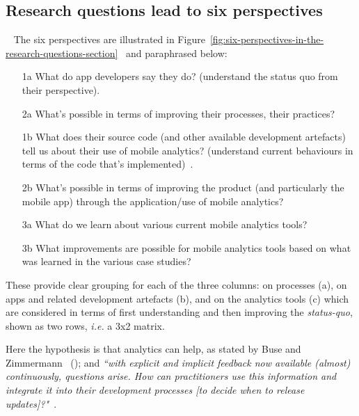 \subsection{Research questions lead to six perspectives}~\label{rq-leads-to-six-perspectives}
The six perspectives are illustrated in Figure~\ref{fig:six-perspectives-in-the-research-questions-section}~ and paraphrased below:
{\footnotesize
\begin{enumerate}
    \item [1a] What do app developers say they do? (understand the status quo from their perspective).
    \item [2a] What's possible in terms of improving their processes, their practices?
    \item [1b] What does their source code (and other available development artefacts) tell us about their use of mobile analytics? (understand current behaviours in terms of the code that's implemented)~.
    \item [2b] What's possible in terms of improving the product (and particularly the mobile app) through the application/use of mobile analytics?
    \item [3a] What do we learn about various current mobile analytics tools?
    \item [3b] What improvements are possible for mobile analytics tools based on what was learned in the various case studies?
\end{enumerate}
}

These provide clear grouping for each of the three columns: on processes (a), on apps and related development artefacts (b), and on the analytics tools (c) which are considered in terms of first understanding and then improving the \emph{status-quo}, shown as two rows, \emph{i.e.} a 3x2 matrix. 


Here the hypothesis is that analytics can help, as stated by Buse and Zimmermann ~(\citeyear{buse_analytics_2010}); and \emph{``with explicit and implicit feedback now available (almost) continuously, questions arise. How can practitioners use this information and integrate it into their development processes [to decide when to release updates]?"}~.

